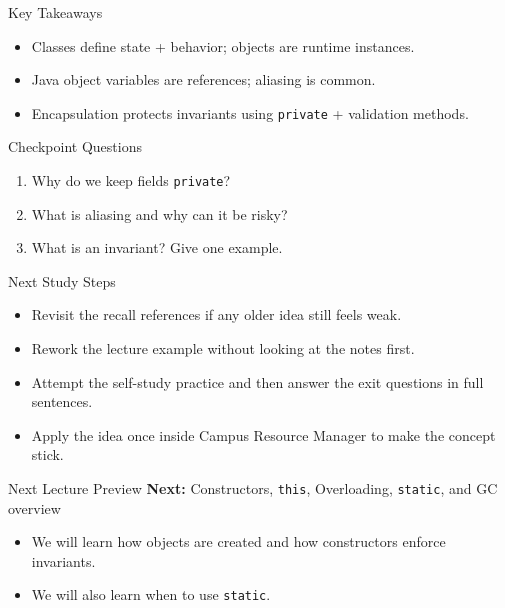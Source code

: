 \documentclass{beamer}
\begin{document}
\begin{frame}{Key Takeaways}
  \begin{itemize}[<+->]
    \item Classes define state + behavior; objects are runtime instances.
    \item Java object variables are references; aliasing is common.
    \item Encapsulation protects invariants using \texttt{private} + validation methods.
  \end{itemize}
  \slidesources{\OOPSUnitIISources}
\end{frame}

\begin{frame}{Checkpoint Questions}
  \begin{enumerate}[<+->]
    \item Why do we keep fields \texttt{private}?
    \item What is aliasing and why can it be risky?
    \item What is an invariant? Give one example.
  \end{enumerate}
  \slidesources{\OOPSUnitIISources}
\end{frame}

\begin{frame}{Next Study Steps}
\begin{itemize}[<+->]
  \item Revisit the recall references if any older idea still feels weak.
  \item Rework the lecture example without looking at the notes first.
  \item Attempt the self-study practice and then answer the exit questions in full sentences.
  \item Apply the idea once inside Campus Resource Manager to make the concept stick.
\end{itemize}
  \slidesources{\OOPSUnitIISources}
\end{frame}

\begin{frame}{Next Lecture Preview}
  \textbf{Next:} Constructors, \texttt{this}, Overloading, \texttt{static}, and GC overview
  \vspace{0.6em}
  \begin{itemize}[<+->]
    \item We will learn how objects are created and how constructors enforce invariants.
    \item We will also learn when to use \texttt{static}.
  \end{itemize}
  \slidesources{\OOPSUnitIISources}
\end{frame}
\end{document}
